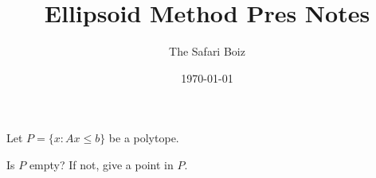 

\title{	
\normalfont
\huge Ellipsoid Method Pres Notes
}

\author{The Safari Boiz}
\date{\normalsize\today} %

\maketitle %

Let \(P = \{x : Ax \leq b\}\) be a polytope.
\begin{question}
  Is \(P\) empty? If not, give a point in \(P\).
\end{question}






